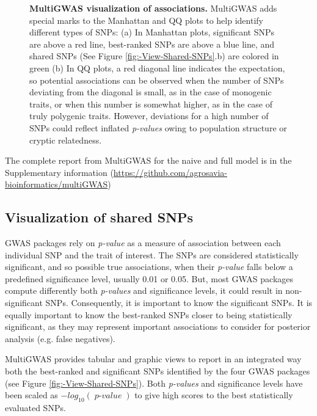 \documentclass{article}
\newcommand{\mathB}[1]{{\operatorname{\mathit{#1}}}}
\begin{document}
\begin{figure}[H]
\caption{\scriptsize\textbf{MultiGWAS visualization of associations.} MultiGWAS adds special marks to the Manhattan and QQ plots to help identify different types of SNPs: (a) In Manhattan plots, significant SNPs are above a red line, best-ranked SNPs are above a blue line, and shared SNPs (See Figure \ref{fig:-View-Shared-SNPs}.b) are colored in green (b) In QQ plots, a red diagonal line indicates the expectation, so potential associations can be observed when the number of SNPs deviating from the diagonal is small, as in the case of monogenic traits, or when this number is somewhat higher, as in the case of truly polygenic traits. However, deviations for a high number of SNPs could reflect inflated \emph{p-values }owing to population structure or cryptic relatedness. \label{fig:view-qqmanhattan}}
\end{figure}


The complete report from MultiGWAS for the naive and full model is in the Supplementary information (\href{https://github.com/agrosavia-bioinformatics/multiGWAS}{https://github.com/agrosavia-bioinformatics/multiGWAS}) 




\subsection{Visualization of shared SNPs}
GWAS packages rely on \emph{p-value }as a measure of association between each individual SNP and the trait of interest. The SNPs are considered statistically significant, and so possible true associations, when their \emph{p-value }falls below a predefined significance level, usually 0.01 or 0.05. But, most GWAS packages compute differently both \emph{p-values }and significance levels, it could result in non-significant SNPs. Consequently, it is important to know the significant SNPs. It is equally important to know the best-ranked SNPs closer to being statistically significant, as they may represent important associations to consider for posterior analysis (e.g. false negatives).

MultiGWAS provides tabular and graphic views to report in an integrated way both the best-ranked and significant SNPs identified by the four GWAS packages (see Figure \ref{fig:-View-Shared-SNPs}). Both \emph{p-values} and significance levels have been scaled as $-log_{10}(\mathB{p-value})$ to give high scores to the best statistically evaluated SNPs.
\end{document}
